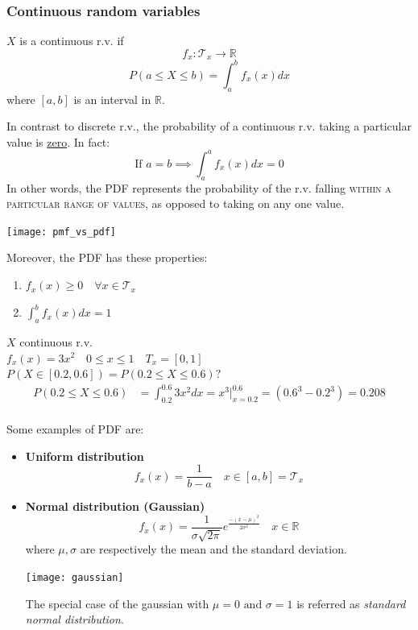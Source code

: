 \documentclass{article}
\begin{document}
\subsubsection{Continuous random variables}
\begin{definition}
    $X$ is a continuous r.v. if 
    $$f_x:\mathcal{T}_x\to \mathbb{R}$$
    $$P(a\leq X\leq b)=\int_a^b f_x(x)dx$$
    where $[a,b]$ is an interval in $\mathbb{R}$.
\end{definition}
In contrast to discrete r.v., the probability of a continuous r.v. taking a
particular value is \underline{zero}. In fact:
$$\text{If }a=b\implies\int_a^af_x(x)dx=0$$
In other words, the PDF represents the probability of the r.v. falling
\textsc{within a particular range of values}, as opposed to taking on any
one value.
\begin{center}
    \texttt{[image: pmf\_vs\_pdf]}
\end{center}
Moreover, the PDF has these properties:
\begin{enumerate}
    \item $f_x(x)\geq0\quad\forall x\in\mathcal{T}_x$
    \item $\int_a^bf_x(x)dx=1$
\end{enumerate}
\begin{example}
    $X$ continuous r.v.\\ 
    $f_x(x)=3x^2\quad0\leq x\leq 1\quad T_x=[0,1]$\\ 
    $P(X\in[0.2,0.6])=P(0.2\leq X\leq 0.6)?$
    $$
    \begin{aligned}
        P(0.2\leq X\leq
        0.6)&=\int_{0.2}^{0.6}3x^2dx=x^3|_{x=0.2}^{0.6}=(0.6^3-0.2^3)=0.208\\
    \end{aligned}
    $$
\end{example}
Some examples of PDF are:
\begin{itemize}
    \item \textbf{Uniform distribution}
        $$f_x(x)=\frac{1}{b-a}\quad x\in[a,b]=\mathcal{T}_x$$
    \item \textbf{Normal distribution (Gaussian)}
        $$f_x(x)=\frac{1}{\sigma\sqrt{2\pi}}e^{\frac{-(x-\mu)^2}{2\sigma^2}}\quad
        x\in \mathbb{R}$$
        where $\mu,\sigma$ are respectively the mean and the standard deviation.
        \begin{center}
            \texttt{[image: gaussian]}
        \end{center}
        The special case of the gaussian with $\mu=0\text{ and }\sigma=1$ is
        referred as \textit{standard normal distribution}.
\end{itemize}
\end{document}
